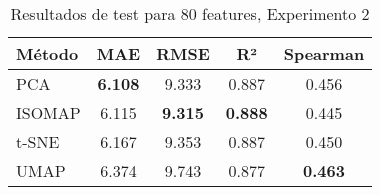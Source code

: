 \begin{table}[h]
\centering
\begin{tabular}{lcccc}
\toprule
\textbf{Método} & \textbf{MAE} & \textbf{RMSE} & \textbf{R²} & \textbf{Spearman} \\
\midrule
PCA & \textbf{6.108} & 9.333 & 0.887 & 0.456 \\
ISOMAP & 6.115 & \textbf{9.315} & \textbf{0.888} & 0.445 \\
t-SNE & 6.167 & 9.353 & 0.887 & 0.450 \\
UMAP & 6.374 & 9.743 & 0.877 & \textbf{0.463} \\
\bottomrule
\end{tabular}
\caption{Resultados de test para 80 features, Experimento 2}
\label{tab:test_results_80feat_exp2}
\end{table}